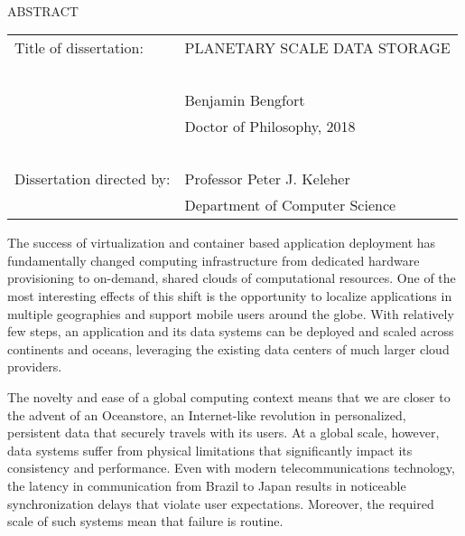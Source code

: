 
\hbox{\ }

\renewcommand{\baselinestretch}{1}
\small \normalsize

\begin{center}
\large{{ABSTRACT}}

\vspace{3em}

\end{center}
\hspace{-.15in}
\begin{tabular}{ll}
Title of dissertation:    & {\large  PLANETARY SCALE DATA STORAGE }\\
\ \\
&                          {\large  Benjamin Bengfort} \\
&                           {\large Doctor of Philosophy, 2018} \\
\ \\
Dissertation directed by: & {\large  Professor Peter J. Keleher} \\
&               {\large  Department of Computer Science } \\
\end{tabular}

\vspace{3em}

\renewcommand{\baselinestretch}{2}
\large \normalsize

The success of virtualization and container based application deployment has fundamentally changed computing infrastructure from dedicated hardware provisioning to on-demand, shared clouds of computational resources. One of the most interesting effects of this shift is the opportunity to localize applications in multiple geographies and support mobile users around the globe. With relatively few steps, an application and its data systems can be deployed and scaled across continents and oceans, leveraging the existing data centers of much larger cloud providers.

The novelty and ease of a global computing context means that we are closer to the advent of an Oceanstore, an Internet-like revolution in personalized, persistent data that securely travels with its users. At a global scale, however, data systems suffer from physical limitations that significantly impact its consistency and performance. Even with modern telecommunications technology, the latency in communication from Brazil to Japan results in noticeable synchronization delays that violate user expectations. Moreover, the required scale of such systems mean that failure is routine.

